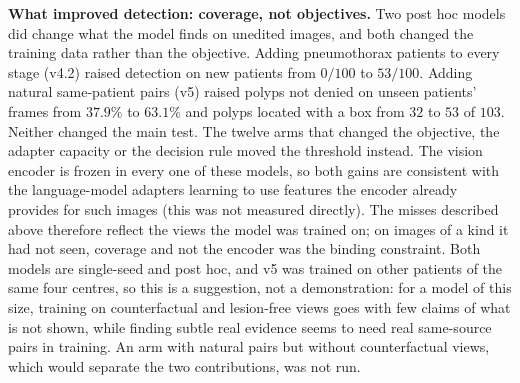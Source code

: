 \documentclass[5p,times,twocolumn,authoryear]{elsarticle}
\begin{document}
\textbf{What improved detection: coverage, not objectives.} Two post hoc models did change what the model finds on unedited images, and both changed the training data rather than the objective. Adding pneumothorax patients to every stage (v4.2) raised detection on new patients from $0/100$ to $53/100$. Adding natural same-patient pairs (v5) raised polyps not denied on unseen patients' frames from $37.9\%$ to $63.1\%$ and polyps located with a box from $32$ to $53$ of $103$. Neither changed the main test. The twelve arms that changed the objective, the adapter capacity or the decision rule moved the threshold instead. The vision encoder is frozen in every one of these models, so both gains are consistent with the language-model adapters learning to use features the encoder already provides for such images (this was not measured directly). The misses described above therefore reflect the views the model was trained on; on images of a kind it had not seen, coverage and not the encoder was the binding constraint. Both models are single-seed and post hoc, and v5 was trained on other patients of the same four centres, so this is a suggestion, not a demonstration: for a model of this size, training on counterfactual and lesion-free views goes with few claims of what is not shown, while finding subtle real evidence seems to need real same-source pairs in training. An arm with natural pairs but without counterfactual views, which would separate the two contributions, was not run.
\end{document}
